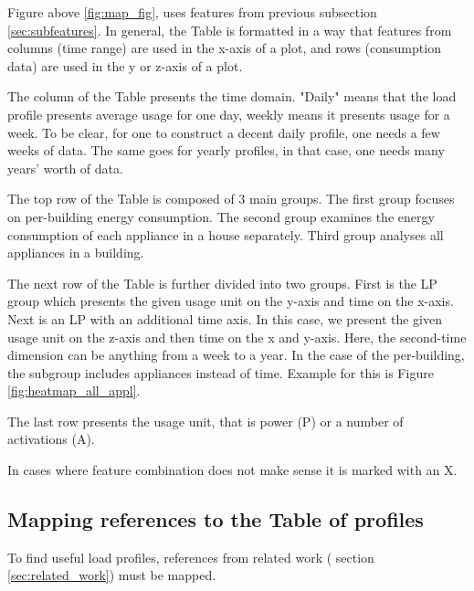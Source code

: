 Figure above \ref{fig:map_fig}, uses features from previous subsection \ref{sec:subfeatures}. 
In general, the Table is formatted in a way that features from columns (time range) are
used in the x-axis of a plot, and rows (consumption data) are used in the y or z-axis of a plot. 

The column of the Table presents the time domain. "Daily" means that the load profile presents
average usage for one day, weekly means it presents usage for a week.
To be clear, for one to construct a decent daily profile, one needs a few
weeks of data. The same goes for yearly profiles, in that case, one needs many years' worth of data. 

The top row of the Table is composed of 3 main groups. 
The first group focuses on per-building energy consumption.
The second group examines the energy consumption of each appliance in a house separately.
Third group analyses all appliances in a building.

The next row of the Table is further divided into two groups. 
First is the LP group which presents the given usage unit on the y-axis and time on the x-axis. 
Next is an LP with an additional time axis. 
In this case, we present the given usage unit on the z-axis and then time on the x and y-axis.
Here, the second-time dimension can be anything from a week to a year.
In the case of the per-building, the subgroup includes appliances instead of time. 
Example for this is Figure \ref{fig:heatmap_all_appl}.

The last row presents the usage unit, that is power (P) or a number of activations (A).

In cases where feature combination does not make sense it is marked with an X.

\subsection{Mapping references to the Table of profiles}

To find useful load profiles, references from related work ( section \ref{sec:related_work}) must be mapped.

